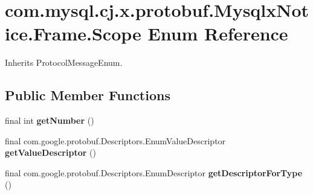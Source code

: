 \hypertarget{enumcom_1_1mysql_1_1cj_1_1x_1_1protobuf_1_1_mysqlx_notice_1_1_frame_1_1_scope}{}\section{com.\+mysql.\+cj.\+x.\+protobuf.\+Mysqlx\+Notice.\+Frame.\+Scope Enum Reference}
\label{enumcom_1_1mysql_1_1cj_1_1x_1_1protobuf_1_1_mysqlx_notice_1_1_frame_1_1_scope}


Inherits Protocol\+Message\+Enum.

\subsection*{Public Member Functions}
\begin{DoxyCompactItemize}
\item 
\mbox{\label{enumcom_1_1mysql_1_1cj_1_1x_1_1protobuf_1_1_mysqlx_notice_1_1_frame_1_1_scope_a1938b2ebbbe401e25aadc70eb98a3432}} 
final int {\bfseries get\+Number} ()
\item 
\mbox{\label{enumcom_1_1mysql_1_1cj_1_1x_1_1protobuf_1_1_mysqlx_notice_1_1_frame_1_1_scope_a879e09fd5e196310c6cb4e8562d1dc55}} 
final com.\+google.\+protobuf.\+Descriptors.\+Enum\+Value\+Descriptor {\bfseries get\+Value\+Descriptor} ()
\item 
\mbox{\label{enumcom_1_1mysql_1_1cj_1_1x_1_1protobuf_1_1_mysqlx_notice_1_1_frame_1_1_scope_a39037c262b16a806f02ddf6706ddc3ad}} 
final com.\+google.\+protobuf.\+Descriptors.\+Enum\+Descriptor {\bfseries get\+Descriptor\+For\+Type} ()
\end{DoxyCompactItemize}
